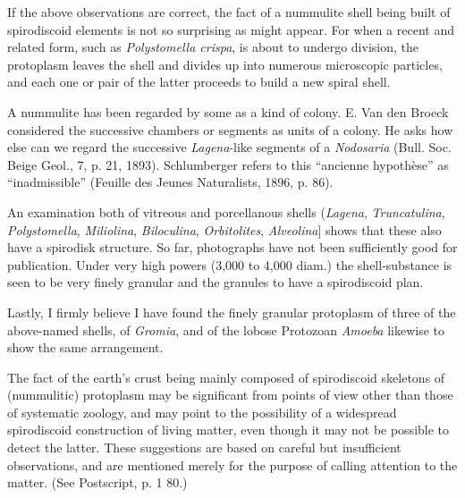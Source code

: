 \documentclass[a4paper, 12pt, oneside]{article}
\begin{document}
If the above observations are correct, the fact of a nummulite shell being built of spirodiscoid elements is not so surprising as might appear. For when a recent and related form, such as \emph{Polystomella crispa}, is about to undergo division, the protoplasm leaves the shell and divides up into numerous microscopic particles, and each one or pair of the latter proceeds to build a new spiral shell.

A nummulite has been regarded by some as a kind of colony. E. Van den Broeck considered the successive chambers or segments as units of a colony. He asks how else can we regard the successive \emph{Lagena}-like segments of a \emph{Nodosaria} (Bull. Soc. Beige Geol., 7, p. 21, 1893). Schlumberger refers to this ``ancienne hypothèse'' as ``inadmissible'' (Feuille des Jeunes Naturalists, 1896, p. 86).

An examination both of vitreous and porcellanous shells (\emph{Lagena}, \emph{Truncatulina}, \emph{Polystomella}, \emph{Miliolina}, \emph{Biloculina}, \emph{Orbitolites}, \emph{Alveolina}] shows that these also have a spirodisk structure. So far, photographs have not been sufficiently good for publication. Under very high powers (3,000 to 4,000 diam.) the shell-substance is seen to be very finely granular and the granules to have a spirodiscoid plan.

Lastly, I firmly believe I have found the finely granular protoplasm of three of the above-named shells, of \emph{Gromia}, and of the lobose Protozoan \emph{Amoeba} likewise to show the same arrangement.

The fact of the earth's crust being mainly composed of spirodiscoid skeletons of (nummulitic) protoplasm may be significant from points of view other than those of systematic zoology, and may point to the possibility of a widespread spirodiscoid construction of living matter, even though it may not be possible to detect the latter. These suggestions are based on careful but insufficient observations, and are mentioned merely for the purpose of calling attention to the matter. (See Postscript, p. 1 80.)
\end{document}
